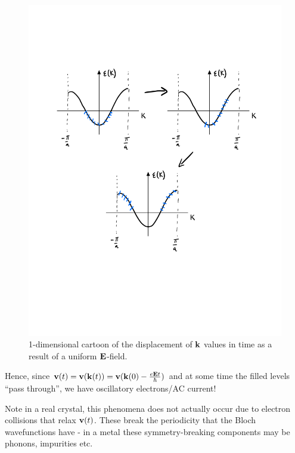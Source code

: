\begin{figure}[htbp]
    \centering
    \includegraphics[scale=0.5]{Images/fig-unifEkt.pdf}
    
    \caption{1-dimensional cartoon of the displacement of $\mathbf{k}$ values in time as a result of a uniform $\mathbf{E}$-field.}
    \label{fig-unifEkt}
\end{figure}

Hence, since $\mathbf{v}(t) = \mathbf{v}(\mathbf{k}(t)) = \mathbf{v}(\mathbf{k}(0) - \frac{e\mathbf{E} t}{\hbar})$ and at some time the filled levels ``pass through'', we have oscillatory electrons/AC current!

Note in a real crystal, this phenomena does not actually occur due to electron collisions that relax $\mathbf{v}(t)$. These break the periodicity that the Bloch wavefunctions have - in a metal these symmetry-breaking components may be phonons, impurities etc.

